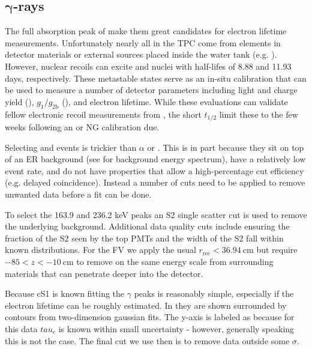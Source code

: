 \subsection{$\mathbf{\gamma}$-rays}
\label{subsec:electron_lifetimes_measurement_gammas}
The full absorption peak of \gammarays make them great candidates for electron lifetime measurements.  Unfortunately nearly all
\gammarays in the TPC come from elements in detector materials or external sources placed inside the water tank
(e.g. ).  However, nuclear recoils can excite  and  nuclei with half-lifes
of 8.88 and 11.93 days, respectively.  These metastable states serve as an in-situ calibration that can be used to measure a number of
detector parameters including light and charge yield (), $g_1/g_{2\mathrm{b}}$
(), and electron lifetime.  While these evaluations can validate fellow
electronic recoil measurements from , the short $t_{1/2}$ limit these to the few weeks following an \ambe or NG
calibration due.

Selecting  and  events is trickier than $\alpha$ or .  This is in part because they sit
on top of an ER background (see  for background energy spectrum), have a
relatively low event rate, and do not have properties that allow a high-percentage cut
efficiency (e.g.  delayed coincidence).  Instead a number of cuts need to be applied to remove unwanted data before a fit
can be done.

To select the 163.9 and 236.2 keV peaks an S2 single scatter cut is used to remove the underlying background.  Additional data quality
cuts include ensuring the fraction of the S2 seen by the top PMTs and the width of the S2 fall within known distributions.  For the FV
we apply the usual $r_{\mathrm{rec}} < 36.94\ \mathrm{cm}$ but require $-85 < z < -10\ \mathrm{cm}$ to remove \gammarays on the same
energy scale from surrounding materials that can penetrate deeper into the detector.

Because cS1 is known fitting the $\gamma$ peaks is reasonably simple, especially if the electron lifetime can be roughly estimated.  In
 they are shown surrounded by contours from two-dimension gaussian fits.  The
y-axis is labeled as \cstwob because for this data $tau_e$ is known within small uncertainty - however, generally speaking this is not
the case.  The final cut we use then is to remove data outside some $\sigma$.

